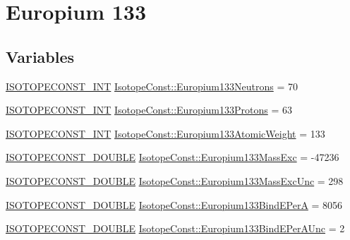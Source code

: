 \hypertarget{group___isotope_const-_europium-_eu133}{}\section{Europium 133}
\label{group___isotope_const-_europium-_eu133}
\subsection*{Variables}
\begin{DoxyCompactItemize}
\item 
\mbox{\hyperlink{group___isotope_const-_macros_ga5f18360b3e99483a35c32d789e62621c}{I\+S\+O\+T\+O\+P\+E\+C\+O\+N\+S\+T\+\_\+\+I\+NT}} \mbox{\hyperlink{group___isotope_const-_europium-_eu133_gaf19fdf2b492f673355fb79f5a6e98c13}{Isotope\+Const\+::\+Europium133\+Neutrons}} = 70
\item 
\mbox{\hyperlink{group___isotope_const-_macros_ga5f18360b3e99483a35c32d789e62621c}{I\+S\+O\+T\+O\+P\+E\+C\+O\+N\+S\+T\+\_\+\+I\+NT}} \mbox{\hyperlink{group___isotope_const-_europium-_eu133_gac296be717cfb33644b5f0a8eb45e60e5}{Isotope\+Const\+::\+Europium133\+Protons}} = 63
\item 
\mbox{\hyperlink{group___isotope_const-_macros_ga5f18360b3e99483a35c32d789e62621c}{I\+S\+O\+T\+O\+P\+E\+C\+O\+N\+S\+T\+\_\+\+I\+NT}} \mbox{\hyperlink{group___isotope_const-_europium-_eu133_ga3fd5edf36c666007bf1161c6a6427ea7}{Isotope\+Const\+::\+Europium133\+Atomic\+Weight}} = 133
\item 
\mbox{\hyperlink{group___isotope_const-_macros_ga8f45a7272ce02c0b4c65c44636ed719a}{I\+S\+O\+T\+O\+P\+E\+C\+O\+N\+S\+T\+\_\+\+D\+O\+U\+B\+LE}} \mbox{\hyperlink{group___isotope_const-_europium-_eu133_ga41d5d90df2d22d5d19a2fc58bdb2bec1}{Isotope\+Const\+::\+Europium133\+Mass\+Exc}} = -\/47236
\item 
\mbox{\hyperlink{group___isotope_const-_macros_ga8f45a7272ce02c0b4c65c44636ed719a}{I\+S\+O\+T\+O\+P\+E\+C\+O\+N\+S\+T\+\_\+\+D\+O\+U\+B\+LE}} \mbox{\hyperlink{group___isotope_const-_europium-_eu133_gae4752cee429a502f4dd7c9d5dee4f3c3}{Isotope\+Const\+::\+Europium133\+Mass\+Exc\+Unc}} = 298
\item 
\mbox{\hyperlink{group___isotope_const-_macros_ga8f45a7272ce02c0b4c65c44636ed719a}{I\+S\+O\+T\+O\+P\+E\+C\+O\+N\+S\+T\+\_\+\+D\+O\+U\+B\+LE}} \mbox{\hyperlink{group___isotope_const-_europium-_eu133_ga80284e2013b5798f7550387fe1d7380d}{Isotope\+Const\+::\+Europium133\+Bind\+E\+PerA}} = 8056
\item 
\mbox{\hyperlink{group___isotope_const-_macros_ga8f45a7272ce02c0b4c65c44636ed719a}{I\+S\+O\+T\+O\+P\+E\+C\+O\+N\+S\+T\+\_\+\+D\+O\+U\+B\+LE}} \mbox{\hyperlink{group___isotope_const-_europium-_eu133_ga8f15ed1c7ef13ee618a3a08d6d6723e8}{Isotope\+Const\+::\+Europium133\+Bind\+E\+Per\+A\+Unc}} = 2

\end{DoxyCompactItemize}
